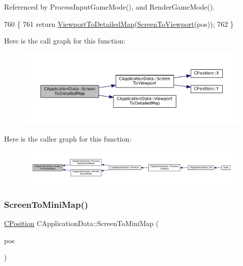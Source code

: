 Referenced by Process\+Input\+Game\+Mode(), and Render\+Game\+Mode().


\begin{DoxyCode}
760                                                                    \{
761     \textcolor{keywordflow}{return} \hyperlink{classCApplicationData_a2871f1b0855d14ed77db1abd83585d64}{ViewportToDetailedMap}(\hyperlink{classCApplicationData_aebd3ae4cfd74962413024f1649233f08}{ScreenToViewport}(pos));
762 \}
\end{DoxyCode}
Here is the call graph for this function\+:\nopagebreak
\begin{figure}[H]
\begin{center}
\leavevmode
\includegraphics[width=350pt]{classCApplicationData_a5c8b0ebf35fddb89b22f035544c32222_cgraph}
\end{center}
\end{figure}
Here is the caller graph for this function\+:\nopagebreak
\begin{figure}[H]
\begin{center}
\leavevmode
\includegraphics[width=350pt]{classCApplicationData_a5c8b0ebf35fddb89b22f035544c32222_icgraph}
\end{center}
\end{figure}
\hypertarget{classCApplicationData_a61dfd0d1f56382b3a8f21add40e1f74a}{}\label{classCApplicationData_a61dfd0d1f56382b3a8f21add40e1f74a} 
\subsubsection{\texorpdfstring{Screen\+To\+Mini\+Map()}{ScreenToMiniMap()}}
{\footnotesize\ttfamily \hyperlink{classCPosition}{C\+Position} C\+Application\+Data\+::\+Screen\+To\+Mini\+Map (\begin{DoxyParamCaption}\item[{const \hyperlink{classCPosition}{C\+Position} \&}]{pos }\end{DoxyParamCaption})\hspace{0.3cm}{\ttfamily [protected]}}



